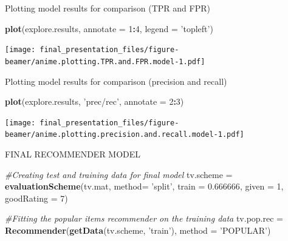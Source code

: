 \documentclass[
  ignorenonframetext,
]{beamer}
\newenvironment{Shaded}{\begin{snugshade}}{\end{snugshade}}
\newcommand{\CommentTok}[1]{\textcolor[rgb]{0.56,0.35,0.01}{\textit{#1}}}
\newcommand{\DataTypeTok}[1]{\textcolor[rgb]{0.13,0.29,0.53}{#1}}
\newcommand{\DecValTok}[1]{\textcolor[rgb]{0.00,0.00,0.81}{#1}}
\newcommand{\FloatTok}[1]{\textcolor[rgb]{0.00,0.00,0.81}{#1}}
\newcommand{\KeywordTok}[1]{\textcolor[rgb]{0.13,0.29,0.53}{\textbf{#1}}}
\newcommand{\NormalTok}[1]{#1}
\newcommand{\OperatorTok}[1]{\textcolor[rgb]{0.81,0.36,0.00}{\textbf{#1}}}
\newcommand{\StringTok}[1]{\textcolor[rgb]{0.31,0.60,0.02}{#1}}
\begin{document}
\begin{frame}[fragile]{Plotting model results for comparison (TPR and
FPR)}
\protect\hypertarget{plotting-model-results-for-comparison-tpr-and-fpr}{}

\begin{Shaded}
\begin{Highlighting}[]
\KeywordTok{plot}\NormalTok{(explore.results, }\DataTypeTok{annotate =} \DecValTok{1}\OperatorTok{:}\DecValTok{4}\NormalTok{, }\DataTypeTok{legend =} \StringTok{'topleft'}\NormalTok{)}
\end{Highlighting}
\end{Shaded}

\texttt{[image: final\_presentation\_files/figure-beamer/anime.plotting.TPR.and.FPR.model-1.pdf]}

\end{frame}

\begin{frame}[fragile]{Plotting model results for comparison (precision
and recall)}
\protect\hypertarget{plotting-model-results-for-comparison-precision-and-recall}{}

\begin{Shaded}
\begin{Highlighting}[]
\KeywordTok{plot}\NormalTok{(explore.results, }\StringTok{'prec/rec'}\NormalTok{, }\DataTypeTok{annotate =} \DecValTok{2}\OperatorTok{:}\DecValTok{3}\NormalTok{)}
\end{Highlighting}
\end{Shaded}

\texttt{[image: final\_presentation\_files/figure-beamer/anime.plotting.precision.and.recall.model-1.pdf]}

\end{frame}

\begin{frame}[fragile]{FINAL RECOMMENDER MODEL}
\protect\hypertarget{final-recommender-model}{}

\begin{Shaded}
\begin{Highlighting}[]
\CommentTok{#Creating test and training data for final model}
\NormalTok{tv.scheme =}\StringTok{ }\KeywordTok{evaluationScheme}\NormalTok{(tv.mat, }\DataTypeTok{method=} \StringTok{'split'}\NormalTok{, }\DataTypeTok{train =} \FloatTok{0.666666}\NormalTok{, }\DataTypeTok{given =} \DecValTok{1}\NormalTok{, }\DataTypeTok{goodRating =} \DecValTok{7}\NormalTok{)}

\CommentTok{#Fitting the popular items recommender on the training data}
\NormalTok{tv.pop.rec =}\StringTok{ }\KeywordTok{Recommender}\NormalTok{(}\KeywordTok{getData}\NormalTok{(tv.scheme, }\StringTok{'train'}\NormalTok{), }\DataTypeTok{method =} \StringTok{'POPULAR'}\NormalTok{)}
\end{Highlighting}
\end{Shaded}

\end{frame}
\end{document}
